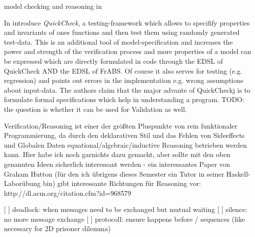 model checking and reasoning in \cite{hutton_tutorial_1999}

In \cite{claessen_quickcheck:_2000} introduce \textit{QuickCheck}, a testing-framework which allows to specifify properties and invariants of ones functions and then test them using randomly generated test-data. This is an additional tool of model-specification and increases the power and strength of the verification process and more properties of a model can be expressed which are directly formulated in code through the EDSL of QuickCheck AND the EDSL of FrABS. Of course it also serves for testing (e.g. regression) and points out errors in the implementation e.g. wrong assumptions about input-data. The authors claim that the major advante of QuickCheckj is to formulate formal specifications which help in understanding a program.
TODO: the question is whether it can be used for Validation as well.

Verification/Reasoning ist einer der größten Pluspunkte von rein funktionaler Programmierung, da durch den deklarativen Stil und das Fehlen von Sideeffects und Globalen Daten equational/algebraic/inductive Reasoning betrieben werden kann. Hier habe ich noch garnichts dazu gemacht, aber sollte mit den oben genannten Ideen sicherlich interessant werden - ein interessantes Paper von Graham Hutton (für den ich übrigens dieses Semester ein Tutor in seiner Haskell-Laborübung bin) gibt interessante Richtungen für Reasoning vor: http://dl.acm.org/citation.cfm?id=968579

[ ] deadlock: when messages need to be exchanged but mutual waiting
[ ] silence: no more message exchange
[ ] protocoll: ensure happens before / sequences (like necessary for 2D prisoner dilemma)